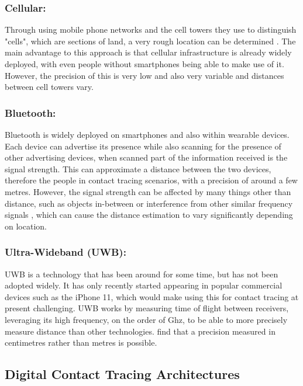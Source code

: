 \documentclass{l4proj}
\begin{document}
\subsubsection{Cellular:}

Through using mobile phone networks and the cell towers they use to distinguish "cells", which are sections of land, a very rough location can be determined \citep{hernandez-orallo_evaluating_2020}. The main advantage to this approach is that cellular infrastructure is already widely deployed, with even people without smartphones being able to make use of it. However, the precision of this is very low and also very variable and distances between cell towers vary.

\subsubsection{Bluetooth:}

Bluetooth is widely deployed on smartphones and also within wearable devices. Each device can advertise its presence while also scanning for the presence of other advertising devices, when scanned part of the information received is the signal strength. This can approximate a distance between the two devices, therefore the people in contact tracing scenarios, with a precision of around a few metres. However, the signal strength can be affected by many things other than distance, such as objects in-between or interference from other similar frequency signals \citep{ahmed_survey_2020}, which can cause the distance estimation to vary significantly depending on location.

\subsubsection{Ultra-Wideband (UWB):}

UWB is a technology that has been around for some time, but has not been adopted widely. It has only recently started appearing in popular commercial devices such as the iPhone 11, which would make using this for contact tracing at present challenging. UWB works by measuring time of flight between receivers, leveraging its high frequency, on the order of Ghz, to be able to more precisely measure distance than other technologies. \citet{angelis_experimental_2008} find that a precision measured in centimetres rather than metres is possible.

\subsection{Digital Contact Tracing Architectures}
\end{document}
